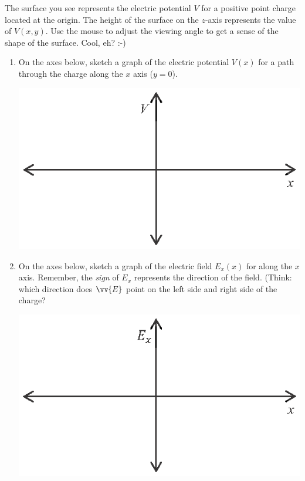 The surface you see represents the electric potential $V$ for a positive point charge located at the origin.  The height of the surface on the $z$-axis represents the value of $V(x,y)$.  Use the mouse to adjust the viewing angle to get a sense of the shape of the surface.  Cool, eh?  :-)

\begin{enumerate}[wide, label=(\emph{\alph*})]

\item On the axes below, sketch a graph of the electric potential $V(x)$ for a path through the charge along the $x$ axis ($y=0$).  
\begin{center}
\includegraphics{potential_superposition/activity_1_figs/V_axes.eps}
\end{center}

\item On the axes below, sketch a graph of the electric field $E_x(x)$ for along the $x$ axis.  Remember, the \textit{sign} of $E_x$ represents the direction of the field.  (Think: which direction does $\vv{E}$ point on the left side and right side of the charge?
\begin{center}
\includegraphics{potential_superposition/activity_1_figs/E_axes.eps}
\end{center}


\end{enumerate}
